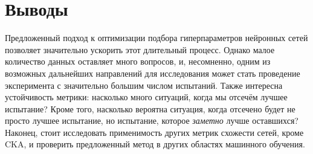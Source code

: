 \section{Выводы}
Предложенный подход к оптимизации подбора гиперпараметров нейронных сетей позволяет значительно ускорить этот длительный процесс.
Однако малое количество данных оставляет много вопросов, и, несомненно, одним из возможных дальнейших направлений для исследования может стать
проведение эксперимента с значительно большим числом испытаний.
Также интересна устойчивость метрики: насколько много ситуаций, когда мы отсечём лучшее испытание?
Кроме того, насколько вероятна ситуация, когда отсечено будет не просто лучшее испытание, но испытание, которое \textit{заметно} лучше оставшихся?
Наконец, стоит исследовать применимость других метрик схожести сетей, кроме CKA, и проверить предложенный метод в других областях машинного обучения.